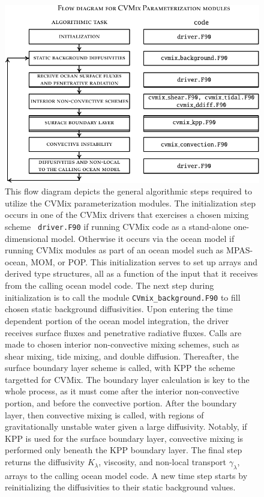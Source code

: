 \begin{figure}[h!t]
\begin{center}
\includegraphics[angle=0,width=15cm]{./mfpic_figs/cvmix_flow_diagram.pdf}
\caption[Flow diagram for CVMix schemes]{\sf This flow diagram depicts
  the general algorithmic steps required to utilize the CVMix
  parameterization modules.  The initialization step occurs in one of
  the CVMix drivers that exercises a chosen mixing scheme {\tt
    driver.F90} if running CVMix code as a stand-alone one-dimensional
  model.  Otherwise it occurs via the ocean model if running CVMix
  modules as part of an ocean model such as MPAS-ocean, MOM, or POP.
  This initialization serves to set up arrays and derived type
  structures, all as a function of the input that it receives from the
  calling ocean model code.  The next step during initialization is to
  call the module {\tt CVmix\_background.F90} to fill chosen static
  background diffusivities.  Upon entering the time dependent portion
  of the ocean model integration, the driver receives surface fluxes
  and penetrative radiative fluxes.  Calls are made to chosen interior
  non-convective mixing schemes, such as shear mixing, tide mixing,
  and double diffusion.  Thereafter, the surface boundary layer scheme
  is called, with KPP the scheme targetted for CVMix.  The boundary
  layer calculation is key to the whole process, as it must come after
  the interior non-convective portion, and before the convective
  portion.  After the boundary layer, then convective mixing is
  called, with regions of gravitationally unstable water given a large
  diffusivity.  Notably, if KPP is used for the surface boundary
  layer, convective mixing is performed only beneath the KPP boundary
  layer.  The final step returns the diffusivity $K_{\lambda}$,
  viscosity, and non-local transport $\gamma_{\lambda}$, arrays to the
  calling ocean model code.  A new time step starts by reinitializing
  the diffusivities to their static background values.}
\label{fig:vertical_mix_flow_cvmix}
\end{center}
\end{figure}



